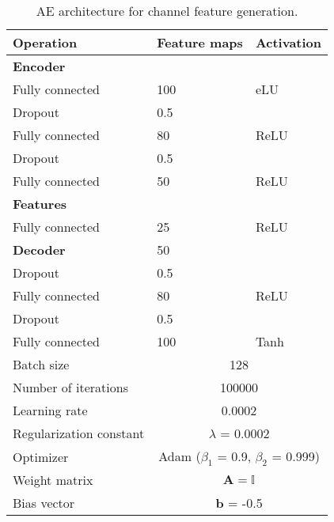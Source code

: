 \begin{table}
	\scriptsize %
	\centering
	\caption{AE architecture for channel feature generation.}
	\begin{tabular}{ p{5cm}|p{3cm}|p{3cm}} 
		\toprule
		Operation & Feature maps  		& Activation  \\
		\midrule
		\textbf{Encoder} & &\\
		Fully connected & 100 & eLU \\ 
		Dropout &0.5&  \\ 
		Fully connected &80& ReLU  \\ 
		Dropout &0.5&  \\ 
		Fully connected & 50 & ReLU  \\  \hline
		\textbf{Features} & &\\
		Fully connected & 25 & ReLU \\  \hline
		\textbf{Decoder} & 50	&   \\
		Dropout &0.5&   \\
		Fully connected & 80 & ReLU  \\  
		Dropout &0.5&   \\
		Fully connected & 100 & Tanh  \\ \hline
		Batch size &  \multicolumn{2}{c}{128}  \\ 
		Number of iterations &  \multicolumn{2}{c}{100000}  \\ 
		Learning rate &  \multicolumn{2}{c}{0.0002}   \\ 
		Regularization constant &  \multicolumn{2}{c}{$\lambda$ = 0.0002}  \\ 
		Optimizer &  \multicolumn{2}{c}{Adam ($\beta_1$ = 0.9, $\beta_2$ = 0.999)}  \\
		Weight matrix &  \multicolumn{2}{c}{$\mathbf{A}=\mathbb{I}$} \\
		Bias vector &  \multicolumn{2}{c}{$\mathbf{b}$ = -0.5} \\ \hline
	\end{tabular}
	
	\label{tab:autoencoder_nn}
\end{table}

